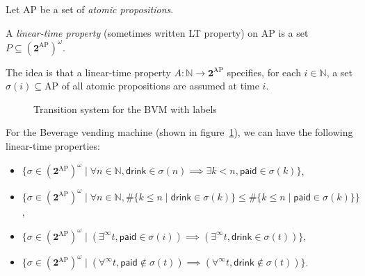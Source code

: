\documentclass[./main]{subfiles}
\begin{document}
  Let $\mathrm{AP}$ be a set of \textit{atomic propositions}.

  \begin{en-defn}
    A \textit{linear-time property} (sometimes written LT property) on $\mathrm{AP}$ is a set $P \subseteq (\mathbf{2}^\mathrm{AP})^\omega$.
  \end{en-defn}
  
  The idea is that a linear-time property $A : \mathds{N} \to \mathbf{2}^\mathrm{AP}$ specifies, for each $i \in \mathds{N}$, a set $\sigma(i) \subseteq \mathrm{AP}$ of all atomic propositions are assumed at time $i$.

  \begin{figure}
    \centering
    \caption{Transition system for the BVM with labels}
    \label{fig:bvm-ts-label}
  \end{figure}

  \begin{en-exm}
    \label{exm:BVM-LTProp}
    For the Beverage vending machine (shown in figure~\ref{fig:bvm-ts-label}), we can have the following linear-time properties:
    \scriptsize
    \begin{itemize}
      \item $\{\sigma \in (\mathbf{2}^\mathrm{AP})^\omega \mid \forall n \in \mathds{N}, \mathsf{drink} \in \sigma(n) \implies\exists k < n, \mathsf{paid} \in \sigma(k) \}$,
      \item $\{\sigma \in (\mathbf{2}^\mathrm{AP})^\omega  \mid \forall n \in \mathds{N}, \#\{k \le n  \mid \mathsf{drink} \in \sigma(k)\} \le \# \{k \le n  \mid \mathsf{paid} \in \sigma(k)\} \} $,
      \item $\{\sigma \in (\mathbf{2}^\mathrm{AP})^\omega  \mid (\exists^\infty t, \mathsf{paid} \in \sigma(i)) \implies(\exists^\infty t, \mathsf{drink} \in \sigma(t)) \} $,
      \item $\{\sigma \in (\mathbf{2}^\mathrm{AP})^\omega \mid (\forall^\infty t, \mathsf{paid} \not\in \sigma(t)) \implies (\forall^\infty t, \mathsf{drink} \not\in \sigma(t)) \} $.
    \end{itemize}
  \end{en-exm}
\end{document}
